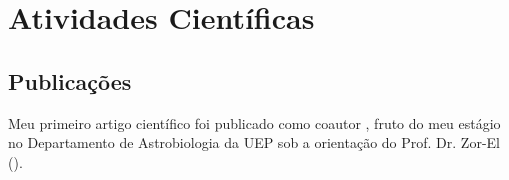 \section{Atividades Científicas}
\label{sec:cientificas}
    \subsection{Publicações}
    \label{subsec:publicacoes}


Meu primeiro artigo científico foi publicado como coautor \cite{jorel2012}, fruto do meu estágio no Departamento de Astrobiologia da UEP sob a orientação do Prof. Dr. Zor-El (). \lipsum[15-16]

